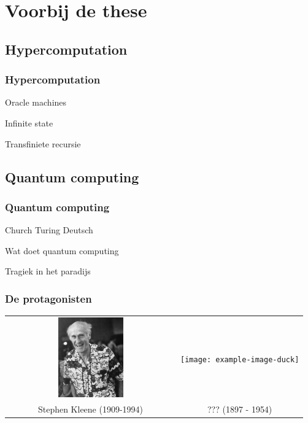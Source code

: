\documentclass{beamer}
\begin{document}
\section{Voorbij de these}
\subsection{Hypercomputation}
\begin{frame}
    \frametitle{Hypercomputation}

    Oracle machines

    Infinite state

    Transfiniete recursie
\end{frame}
\subsection{Quantum computing}
\begin{frame}
    \frametitle{Quantum computing}

    Church Turing Deutsch

    Wat doet quantum computing
\end{frame}

\begin{frame}
    \begin{center}
        {\LARGE Tragiek in het paradijs}
    \end{center}
\end{frame}


\begin{frame}
    \frametitle{De protagonisten}
    \begin{tabular*}{\textwidth}{c c}
        \includegraphics[width=0.4\textwidth]{Kleene.jpeg} & \texttt{[image: example-image-duck]} \\
        {\large Stephen Kleene} (1909-1994) & {\large ???} (1897 - 1954)\\
    \end{tabular*}
\end{frame}
\end{document}
